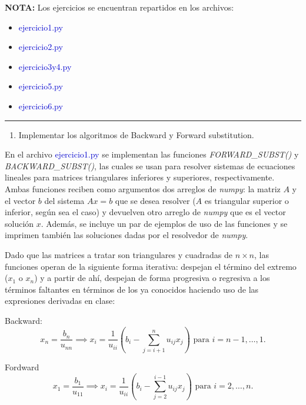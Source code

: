 \textcolor{BrickRed}{\bf NOTA:}  Los ejercicios se encuentran repartidos en los archivos:
\begin{itemize}
	\item \textcolor{mediumblue}{ejercicio1.py}
	\item \textcolor{mediumblue}{ejercicio2.py}
	\item \textcolor{mediumblue}{ejercicio3y4.py}
	\item \textcolor{mediumblue}{ejercicio5.py}
	\item \textcolor{mediumblue}{ejercicio6.py}
\end{itemize}

\vspace{5mm}
{\color{lightgray} \hrule}
\begin{enumerate}
	\item Implementar los algoritmos de Backward y Forward substitution.
\end{enumerate}
En el archivo \textcolor{mediumblue}{ejercicio1.py} se implementan las funciones \textit{FORWARD\_SUBST()} y \textit{BACKWARD\_SUBST()}, las cuales se usan para resolver sistemas de ecuaciones lineales para matrices triangulares inferiores y superiores, respectivamente. Ambas funciones reciben como argumentos dos arreglos de {\it numpy}: la matriz $A$ y el vector $b$ del sistema $Ax = b$ que se desea resolver ($A$ es triangular superior o inferior, según sea el caso) y devuelven otro arreglo de {\it numpy} que es el vector solución $x$. Además, se incluye un par de  ejemplos de uso de las funciones y se imprimen también las soluciones dadas por el resolvedor de \textit{numpy}.

Dado que las matrices a tratar son triangulares y cuadradas de $n\times n$, las funciones operan de la siguiente forma iterativa: despejan el término del extremo ($x_{1}$ o $x_{n}$) y a partir de ahí, despejan de forma progresiva o regresiva a los términos faltantes en términos de los ya conocidos haciendo uso de las expresiones derivadas en clase:

Backward:
\begin{equation}
	x_{n} = \frac{b_{n}}{u_{nn}} \implies x_{i} = \frac{1}{u_{ii}} \left( b_{i} - \sum_{j=i+1}^{n} u_{ij}x_{j} \right) \text{ para } i = n-1, \dots, 1.
\end{equation}

Fordward
\begin{equation}
	x_{1} = \frac{b_{1}}{u_{11}} \implies x_{i} = \frac{1}{u_{ii}} \left( b_{i} - \sum_{j=2}^{i-1} u_{ij}x_{j} \right) \text{ para } i = 2, \dots, n.
\end{equation}

